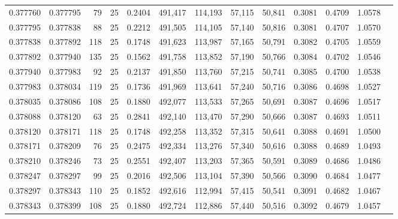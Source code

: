 \begin{tabular}{rrrrrrrrrrrrr}
0.377760 & 0.377795 &    79 &  25 &                                     0.2404 & 491,417 & 114,193 &  57,115 &  50,841 & 0.3081 & 0.4709 & 1.0578 \\
0.377795 & 0.377838 &    88 &  25 &                                     0.2212 & 491,505 & 114,105 &  57,140 &  50,816 & 0.3081 & 0.4707 & 1.0570 \\
0.377838 & 0.377892 &   118 &  25 &                                     0.1748 & 491,623 & 113,987 &  57,165 &  50,791 & 0.3082 & 0.4705 & 1.0559 \\
0.377892 & 0.377940 &   135 &  25 &                                     0.1562 & 491,758 & 113,852 &  57,190 &  50,766 & 0.3084 & 0.4702 & 1.0546 \\
0.377940 & 0.377983 &    92 &  25 &                                     0.2137 & 491,850 & 113,760 &  57,215 &  50,741 & 0.3085 & 0.4700 & 1.0538 \\
0.377983 & 0.378034 &   119 &  25 &                                     0.1736 & 491,969 & 113,641 &  57,240 &  50,716 & 0.3086 & 0.4698 & 1.0527 \\
0.378035 & 0.378086 &   108 &  25 &                                     0.1880 & 492,077 & 113,533 &  57,265 &  50,691 & 0.3087 & 0.4696 & 1.0517 \\
0.378088 & 0.378120 &    63 &  25 &                                     0.2841 & 492,140 & 113,470 &  57,290 &  50,666 & 0.3087 & 0.4693 & 1.0511 \\
0.378120 & 0.378171 &   118 &  25 &                                     0.1748 & 492,258 & 113,352 &  57,315 &  50,641 & 0.3088 & 0.4691 & 1.0500 \\
0.378171 & 0.378209 &    76 &  25 &                                     0.2475 & 492,334 & 113,276 &  57,340 &  50,616 & 0.3088 & 0.4689 & 1.0493 \\
0.378210 & 0.378246 &    73 &  25 &                                     0.2551 & 492,407 & 113,203 &  57,365 &  50,591 & 0.3089 & 0.4686 & 1.0486 \\
0.378247 & 0.378297 &    99 &  25 &                                     0.2016 & 492,506 & 113,104 &  57,390 &  50,566 & 0.3090 & 0.4684 & 1.0477 \\
0.378297 & 0.378343 &   110 &  25 &                                     0.1852 & 492,616 & 112,994 &  57,415 &  50,541 & 0.3091 & 0.4682 & 1.0467 \\
0.378343 & 0.378399 &   108 &  25 &                                     0.1880 & 492,724 & 112,886 &  57,440 &  50,516 & 0.3092 & 0.4679 & 1.0457 \\

\end{tabular}
